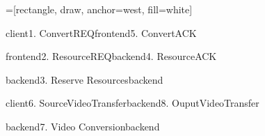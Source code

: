 \documentclass[tikz, border={-5.75pt 0 0 0}]{standalone}
\begin{document}
\begin{sequencediagram}[font=\scriptsize]
	\def\unitfactor{0.7}
	=[rectangle, draw, anchor=west, fill=white]
	
	
	\begin{call}{client}{1. ConvertREQ}{frontend}{5. ConvertACK}
		\begin{call}{frontend}{2. ResourceREQ}{backend}{4. ResourceACK}
			\begin{call}{backend}{3. Reserve Resources}{backend}{}
			\end{call}
		\end{call}
	\end{call}
	
	\begin{call}{client}{6. SourceVideoTransfer}{backend}{8. OuputVideoTransfer}
	\begin{call}{backend}{7. Video Conversion}{backend}{}
	\end{call}
	\end{call}
	

	
	
%	
%	
	
\end{sequencediagram}
\end{document}
